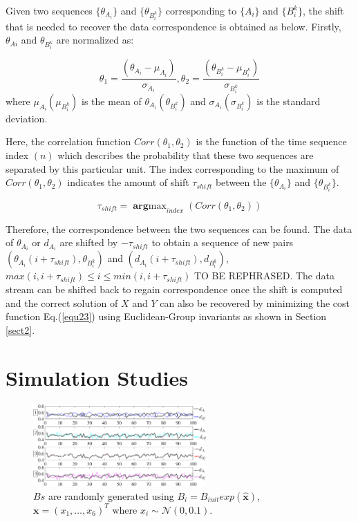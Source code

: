 \documentclass[letterpaper, 10 pt, conference]{ieeeconf}  %
\begin{document}
Given two sequences $\{\theta_{A_{i}}\}$ and $\{\theta_{B_{i}^{k}}\}$ corresponding to  $\{A_{i}\}$ and $\{B_{i}^{k}\}$, the shift that is needed to recover the data correspondence is obtained as below. 
Firstly, $\theta_{Ai}$ and $\theta_{B_{i}^{k}}$ are normalized as:

\begin{equation}\label{equ26}
    \theta_{1}=\frac{(\theta_{A_{i}}-\mu_{A_{i}})}{\sigma_{A_{i}}}, \theta_{2}=\frac{(\theta_{B_{i}^{k}}-\mu_{B_{i}^{k}})}{\sigma_{B_{i}^{k}}}
\end{equation}
where $\mu_{A_{i}}(\mu_{B_{i}^{k}})$ is the mean of $\theta_{A_{i}}(\theta_{B_{i}^{k}})$ and $\sigma_{A_{i}}(\sigma_{B_{i}^{k}})$ is the standard deviation.

Here, the correlation function $Corr(\theta_{1},\theta_{2})$  is the function of the time sequence index $(n)$ which describes the probability that these two sequences are separated by this particular unit. The index corresponding to the maximum of $Corr(\theta_{1},\theta_{2})$  indicates the amount of shift $\tau_{shift}$ between the $\{\theta_{A_{i}}\}$ and $\{\theta_{B_{i}^{k}}\}$.

\begin{equation}\label{equ27}
    \tau_{shift} = \mathop{\mathbf{arg}max}_{index}(Corr(\theta_{1},\theta_{2}))
\end{equation}

Therefore, the correspondence between the two sequences can be found. {\color{red}The data of $\theta_{A_{i}}$ or $d_{A_{i}}$ are shifted by $-\tau_{shift}$ to obtain a sequence of new pairs $(\theta_{A_{i}}(i+\tau_{shift}),\theta_{B_{i}^{k}})$ and $(d_{A_{i}}(i+\tau_{shift}),d_{B_{i}^{k}})$, $max(i,i+\tau_{shift})\leq i \leq min(i,i+\tau_{shift})$ TO BE REPHRASED}. The data stream can be shifted back to regain correspondence once the shift is computed and the correct solution of $X$ and $Y$ can also be recovered by minimizing the cost function Eq.(\ref{equ23}) using Euclidean-Group invariants as shown in Section \ref{sect2}.


\section{Simulation Studies}
\label{sect4}

\begin{center}
\begin{figure}
\centering
\includegraphics[width=2.6in]{fig3.eps}
\caption{
$Bs$ are randomly generated using  $B_i=B_{init}exp(\widehat{\mathbf{x}})$,$\mathbf{x}=(x_1,\dots,x_6)^T $ where $x_i \sim \mathcal{N}(0,0.1)$.
}
\label{fig2}
\end{figure}
\end{center}
\end{document}
